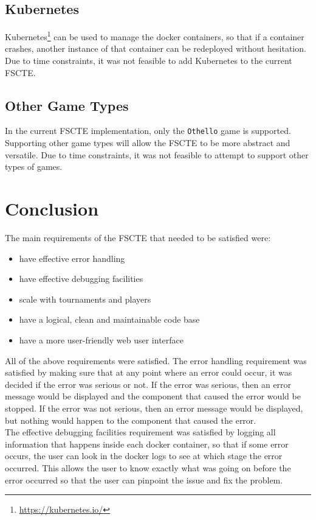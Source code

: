 \documentclass[a4paper, 12pt]{report}
\begin{document}
\section{Kubernetes}

Kubernetes\footnote{\url{https://kubernetes.io/}} can be used to manage the docker
containers, so that if a container crashes, another instance of that container
can be redeployed without hesitation. Due to time constraints, it was not feasible
to add Kubernetes to the current FSCTE.

\section{Other Game Types}

In the current FSCTE implementation, only the \texttt{Othello} game is supported.
Supporting other game types will allow the FSCTE to be more abstract and versatile.
Due to time constraints, it was not feasible to attempt to support other types
of games.

\chapter{Conclusion}
\label{chap:conclusion}

The main requirements of the FSCTE that needed to be satisfied were:
\begin{itemize}
	\item have effective error handling
	\item have effective debugging facilities
	\item scale with tournaments and players
	\item have a logical, clean and maintainable code base
	\item have a more user-friendly web user interface
\end{itemize}
All of the above requirements were satisfied. The error handling requirement
was satisfied by making sure that at any point where an error could occur, it
was decided if the error was serious or not. If the error was serious, then an
error message would be displayed and the component that caused the error would
be stopped. If the error was not serious, then an error message would be displayed,
but nothing would happen to the component that caused the error. \\

The effective debugging facilities requirement was satisfied by logging all
information that happens inside each docker container, so that if some error
occurs, the user can look in the docker logs to see at which stage the error
occurred. This allows the user to know exactly what was going on before the
error occurred so that the user can pinpoint the issue and fix the problem. \\
\end{document}
